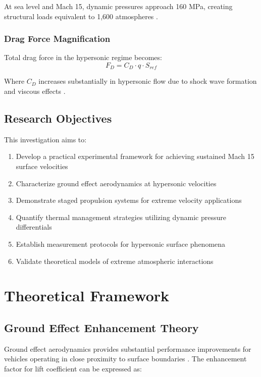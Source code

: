 \documentclass[12pt,a4paper]{article}
\begin{document}
At sea level and Mach 15, dynamic pressures approach 160 MPa, creating structural loads equivalent to 1,600 atmospheres \cite{bertin2013hypersonic}.

\subsubsection{Drag Force Magnification}
Total drag force in the hypersonic regime becomes:
\begin{equation}
F_D = C_D \cdot q \cdot S_{ref}
\label{eq:drag_force}
\end{equation}

Where $C_D$ increases substantially in hypersonic flow due to shock wave formation and viscous effects \cite{anderson2006hypersonic}.

\subsection{Research Objectives}

This investigation aims to:
\begin{enumerate}
\item Develop a practical experimental framework for achieving sustained Mach 15 surface velocities
\item Characterize ground effect aerodynamics at hypersonic velocities
\item Demonstrate staged propulsion systems for extreme velocity applications
\item Quantify thermal management strategies utilizing dynamic pressure differentials
\item Establish measurement protocols for hypersonic surface phenomena
\item Validate theoretical models of extreme atmospheric interactions
\end{enumerate}

\section{Theoretical Framework}

\subsection{Ground Effect Enhancement Theory}

Ground effect aerodynamics provides substantial performance improvements for vehicles operating in close proximity to surface boundaries \cite{ahmed1983ground, barber1997ground}. The enhancement factor for lift coefficient can be expressed as:
\end{document}

